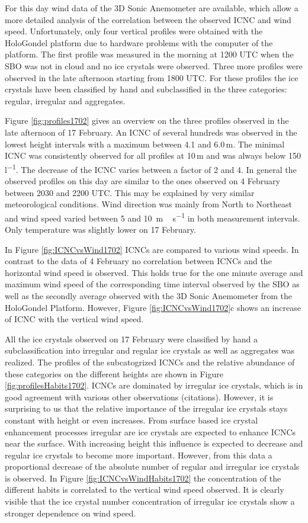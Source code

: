\documentclass[draft,linenumbers]{agujournal}
\begin{document}
For this day wind data of the 3D Sonic Anemometer are available, which allow a more detailed analysis of the correlation between the observed ICNC and wind speed. Unfortunately, only four vertical profiles were obtained with the HoloGondel platform due to hardware problems with the computer of the platform. The first profile was measured in the morning at 1200 UTC when the SBO was not in cloud and no ice crystals were observed. Three more profiles were observed in the late afternoon starting from 1800 UTC. For these profiles the ice crystals have been classified by hand and subclassified in the three categories: regular, irregular and aggregates.

Figure \ref{fig:profiles1702} gives an overview on the three profiles observed in the late afternoon of 17 February. An ICNC of several hundreds was observed in the lowest height intervals with a maximum between 4.1 and 6.0\,\si{m}. The minimal ICNC was consistently observed for all profiles at 10\,\si{m} and was always below 150\,\si{l^{-1}}. The decrease of the ICNC varies between a factor of 2 and 4. In general the observed profiles on this day are similar to the ones observed on 4 February between 2030 and 2200 UTC. This may be explained by very similar meteorological conditions. Wind direction was mainly from North to Northeast and wind speed varied between 5 and 10 \,\si{m\,s^{-1}} in both measurement intervals. Only temperature was slightly lower on 17 February.

In Figure \ref{fig:ICNCvsWind1702} ICNCs are compared to various wind speeds. In contrast to the data of 4 February no correlation between ICNCs and the horizontal wind speed is observed. This holds true for the one minute average and maximum wind speed of the corresponding time interval observed by the SBO as well as the secondly average observed with the 3D Sonic Anemometer from the HoloGondel Platform. However, Figure \ref{fig:ICNCvsWind1702}c shows an increase of ICNC with the vertical wind speed. 

All the ice crystals observed on 17 February were classified by hand a subclassification into irregular and regular ice crystals as well as aggregates was realized. The profiles of the subcatogrized ICNCs and the relative abundance of these categories on the different heights are shown in Figure \ref{fig:profilesHabits1702}. ICNCs are dominated by irregular ice crystals, which is in good agreement with various other observations (citations). However, it is surprising to us that the relative importance of the irregular ice crystals stays constant with height or even increases. From surface based ice crystal enhancement processes irregular are ice crystals are expected to enhance ICNCs near the surface. With increasing height this influence is expected to decrease and regular ice crystals to become more important. However, from this data a proportional decrease of the absolute number of regular and irregular ice crystals is observed. In Figure \ref{fig:ICNCvsWindHabits1702} the concentration of the different habits is correlated to the vertical wind speed observed. It is clearly visible that the ice crystal number concentration of irregular ice crystals show a stronger dependence on wind speed. 
\end{document}
